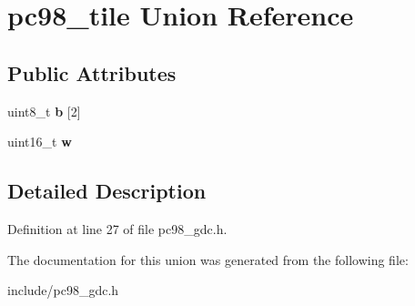 \hypertarget{unionpc98__tile}{\section{pc98\-\_\-tile Union Reference}
\label{unionpc98__tile}
}
\subsection*{Public Attributes}
\begin{DoxyCompactItemize}
\item 
\hypertarget{unionpc98__tile_a1d4e5b3d3509eefc0a5f4a11d8bdea5b}{uint8\-\_\-t {\bfseries b} \mbox{[}2\mbox{]}}\label{unionpc98__tile_a1d4e5b3d3509eefc0a5f4a11d8bdea5b}

\item 
\hypertarget{unionpc98__tile_aeb46ba0689f1df876b1c4ccd8f77a022}{uint16\-\_\-t {\bfseries w}}\label{unionpc98__tile_aeb46ba0689f1df876b1c4ccd8f77a022}

\end{DoxyCompactItemize}


\subsection{Detailed Description}


Definition at line 27 of file pc98\-\_\-gdc.\-h.



The documentation for this union was generated from the following file\-:\begin{DoxyCompactItemize}
\item 
include/pc98\-\_\-gdc.\-h\end{DoxyCompactItemize}
